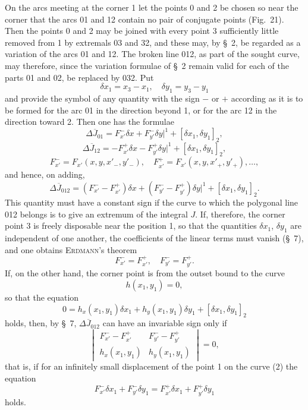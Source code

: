 \documentclass[11pt,a4paper,leqno]{article}
\begin{document}
On the arcs meeting at the corner 1 let the points 0 and 2 be chosen so near the corner that the arcs 01 and 12 contain no pair of conjugate points (Fig.~21). Then the points 0 and 2 may be joined with every point 3 sufficiently little removed from 1 by extremals 03 and 32, and these may, by \S~2, be regarded as a variation of the arcs 01 and 12. The broken line 012, as part of the sought curve, may therefore, since the variation formulae of \S~2 remain valid for each of the parts 01 and 02, be replaced by 032. Put
\[
\delta x_1=x_3-x_1,\quad \delta y_1=y_3-y_1
\]
and provide the symbol of any quantity with the sign $-$ or $+$ according as it is to be formed for the arc 01 in the direction beyond 1, or for the arc 12 in the direction toward 2. Then one has the formulae
\[
\Delta \overline{J}_{01}=F_{x'}^-\delta x+F_{y'}^-\delta y\big|^1+[\delta x_1,\delta y_1]_2,
\]
\[
\Delta \overline{J}_{12}=-F_{x'}^+\delta x-F_{y'}^+\delta y\big|^1+[\delta x_1,\delta y_1]_2,
\]
\[
F_{x'}^- =F_{x'}(x,y,x'_{-},y'_{-}),\quad
F_{x'}^+=F_{x'}(x,y,x'_{+},y'_{+}),\ldots,
\]
and hence, on adding,
\[
\Delta\overline{J}_{012}=(F_{x'}^- -F_{x'}^+)\delta x+(F_{y'}^- -F_{y'}^+)\delta y\big|^1+[\delta x_1,\delta y_1]_2.
\]
This quantity must have a constant sign if the curve to which the polygonal line 012 belongs is to give an extremum of the integral $J$. If, therefore, the corner point 3 is freely disposable near the position 1, so that the quantities $\delta x_1$, $\delta y_1$ are independent of one another, the coefficients of the linear terms must vanish (\S~7), and one obtains \textsc{Erdmann}'s theorem
\begin{equation}\tag{1}
F_{x'}^- =F_{x'}^+,
\quad F_{y'}^- =F_{y'}^+.
\end{equation}
If, on the other hand, the corner point is from the outset bound to the curve
\begin{equation}\tag{2}
h(x_1,y_1)=0,
\end{equation}
so that the equation
\[
0=h_x(x_1,y_1)\delta x_1+h_y(x_1,y_1)\delta y_1+[\delta x_1,\delta y_1]_2
\]
holds, then, by \S~7, $\Delta\overline{J}_{012}$ can have an invariable sign only if
\[
\begin{vmatrix}
F_{x'}^- -F_{x'}^+&F_{y'}^- -F_{y'}^+\\
h_x(x_1,y_1)&h_y(x_1,y_1)
\end{vmatrix}=0,
\]
that is, if for an infinitely small displacement of the point 1 on the curve (2) the equation
\begin{equation}\tag{3}
F_{x'}^-\delta x_1+F_{y'}^-\delta y_1=F_{x'}^+\delta x_1+F_{y'}^+\delta y_1
\end{equation}
holds.
\end{document}
